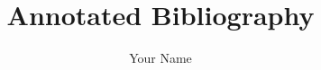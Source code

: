 \documentclass[12pt]{article}
\title{\textbf{Annotated Bibliography}}
\author{Your Name}
\begin{document}
\maketitle

\nocite{*}



\end{document}
